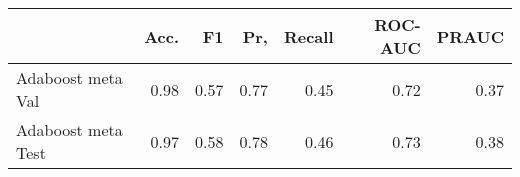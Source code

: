 \begin{tabular}{lrrrrrr}
\toprule
{} &  Acc. &    F1 &   Pr, &  Recall &  ROC-AUC &  PRAUC \\
\midrule
Adaboost meta Val  &  0.98 &  0.57 &  0.77 &    0.45 &     0.72 &   0.37 \\
Adaboost meta Test &  0.97 &  0.58 &  0.78 &    0.46 &     0.73 &   0.38 \\
\bottomrule
\end{tabular}
